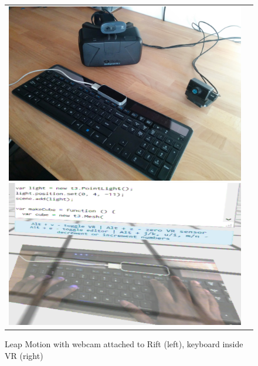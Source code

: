 \documentclass[conference]{IEEEtran}
\begin{document}







\begin{figure}[ht!]
\centering
\begin{tabular}{cc}
	\includegraphics[width=.45\linewidth]{figures/setup/equipment}\label{fig:rift}
 	\includegraphics[width=.45\linewidth]{figures/setup/webcam_passthrough}\label{fig:leap}
\end{tabular}
\caption{Leap Motion with webcam attached to Rift (left), keyboard inside VR (right)}
\end{figure}
\end{document}
